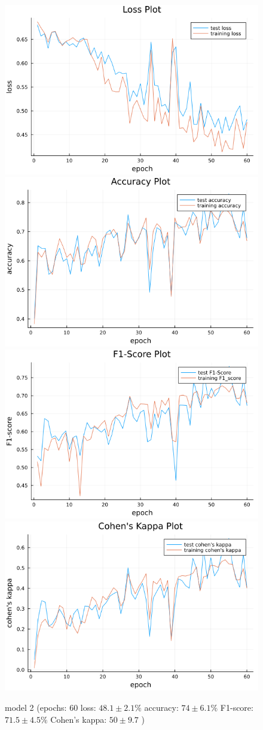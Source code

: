 \documentclass[
a4paper, 
12pt,
grayscalebody, %
abstract=on,
twoside, BCOR10mm, 12pt, DIV13,headinclude, footexclude, final, abstracton, openright
]{ibireprt}
\numberwithin{equation}{chapter}
\numberwithin{table}{chapter}
\numberwithin{figure}{chapter}
\numberwithin{algorithm}{chapter}
\numberwithin{example}{chapter}
\numberwithin{example}{chapter}
\begin{document}
\begin{figure}
	\includegraphics[width=0.4\linewidth]{loss_png_final_1_2.png}\hfill
	\includegraphics[width=0.4\linewidth]{accuracy_png_final_1_2.png}
	\\[\smallskipamount]
	\includegraphics[width=0.4\linewidth]{f1_score_png_final_1_2.png}\hfill
	\includegraphics[width=0.4\linewidth]{cohens_kappa_png_final_1_2.png}
	\caption{model 2 (epochs: 60 loss: $48.1\pm2.1\% $ accuracy: $74\pm6.1\%$ F1-score: $71.5\pm4.5\%$  Cohen's kappa: $50\pm9.7$ )}
\end{figure}
\end{document}
